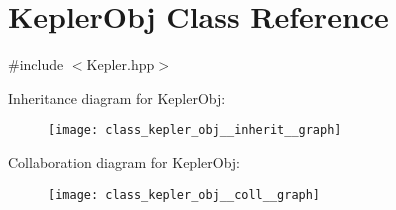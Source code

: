 \hypertarget{class_kepler_obj}{\section{Kepler\-Obj Class Reference}
\label{class_kepler_obj}
}


{\ttfamily \#include $<$Kepler.\-hpp$>$}



Inheritance diagram for Kepler\-Obj\-:\nopagebreak
\begin{figure}[H]
\begin{center}
\leavevmode
\texttt{[image: class\_kepler\_obj\_\_inherit\_\_graph]}
\end{center}
\end{figure}


Collaboration diagram for Kepler\-Obj\-:\nopagebreak
\begin{figure}[H]
\begin{center}
\leavevmode
\texttt{[image: class\_kepler\_obj\_\_coll\_\_graph]}
\end{center}
\end{figure}
